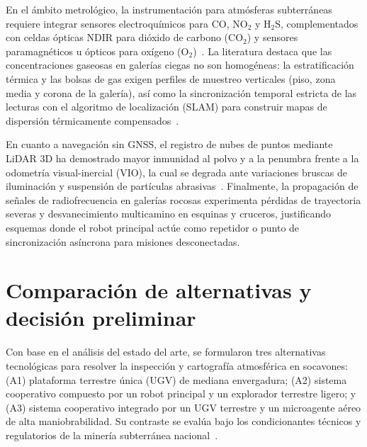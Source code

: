 En el ámbito metrológico, la instrumentación para atmósferas subterráneas requiere integrar sensores electroquímicos para $\text{CO}$, $\text{NO}_2$ y $\text{H}_2\text{S}$, complementados con celdas ópticas NDIR para dióxido de carbono ($\text{CO}_2$) y sensores paramagnéticos u ópticos para oxígeno ($\text{O}_2$)~\cite{OSINERGMIN_BoletinGSM_Ventilacion_2020, MINEM_DS024_2016, EU_ExposureDirective_2020}. La literatura destaca que las concentraciones gaseosas en galerías ciegas no son homogéneas: la estratificación térmica y las bolsas de gas exigen perfiles de muestreo verticales (piso, zona media y corona de la galería), así como la sincronización temporal estricta de las lecturas con el algoritmo de localización (SLAM) para construir mapas de dispersión térmicamente compensados~\cite{KimChoi_2025_MineMapping}.

En cuanto a navegación sin GNSS, el registro de nubes de puntos mediante LiDAR 3D ha demostrado mayor inmunidad al polvo y a la penumbra frente a la odometría visual-inercial (VIO), la cual se degrada ante variaciones bruscas de iluminación y suspensión de partículas abrasivas~\cite{KimChoi_2025_MineMapping}. Finalmente, la propagación de señales de radiofrecuencia en galerías rocosas experimenta pérdidas de trayectoria severas y desvanecimiento multicamino en esquinas y cruceros, justificando esquemas donde el robot principal actúe como repetidor o punto de sincronización asíncrona para misiones desconectadas.


\section{Comparación de alternativas y decisión preliminar}

Con base en el análisis del estado del arte, se formularon tres alternativas tecnológicas para resolver la inspección y cartografía atmosférica en socavones: (A1) plataforma terrestre única (UGV) de mediana envergadura; (A2) sistema cooperativo compuesto por un robot principal y un explorador terrestre ligero; y (A3) sistema cooperativo integrado por un UGV terrestre y un microagente aéreo de alta maniobrabilidad. Su contraste se evalúa bajo los condicionantes técnicos y regulatorios de la minería subterránea nacional~\cite{MINEM_DS024_2016, OSINERGMIN_BoletinGSM_2020, OSINERGMIN_BoletinGSM_Ventilacion_2020}.

